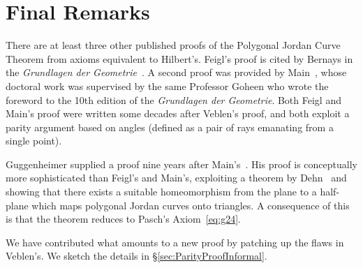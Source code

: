 \section{Final Remarks}
There are at least three other published proofs of the Polygonal Jordan Curve Theorem from axioms equivalent to Hilbert's. Feigl's proof is cited by Bernays in the \emph{Grundlagen der Geometrie}~\cite{FeiglJordan}. A second proof was provided by Main~\cite{MainHilbertGeometry}, whose doctoral work was supervised by the same Professor Goheen who wrote the foreword to the 10th edition of the \emph{Grundlagen der Geometrie}. Both Feigl and Main's proof were written some decades after Veblen's proof, and both exploit a parity argument based on angles (defined as a pair of rays emanating from a single point).

Guggenheimer supplied a proof nine years after Main's~\cite{GuggenheimerJordanProof}. His proof is conceptually more sophisticated than Feigl's and Main's, exploiting a theorem by Dehn~\cite{GuggenheimerJordanCurve} and showing that there exists a suitable homeomorphism from the plane to a half-plane which maps polygonal Jordan curves onto triangles. A consequence of this is that the theorem reduces to Pasch's Axiom~\ref{eq:g24}.

We have contributed what amounts to a new proof by patching up the flaws in Veblen's. We sketch the details in \S\ref{sec:ParityProofInformal}.

